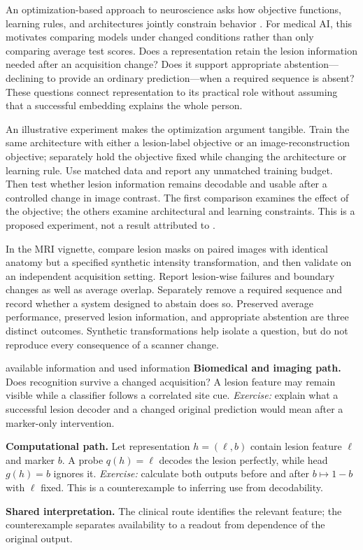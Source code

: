 \documentclass[11pt,a4paper]{article}
\begin{document}
An optimization-based approach to neuroscience asks how objective functions, learning rules, and architectures jointly constrain behavior \citep{richards2019}. For medical AI, this motivates comparing models under changed conditions rather than only comparing average test scores. Does a representation retain the lesion information needed after an acquisition change? Does it support appropriate abstention---declining to provide an ordinary prediction---when a required sequence is absent? These questions connect representation to its practical role without assuming that a successful embedding explains the whole person.

An illustrative experiment makes the optimization argument tangible. Train the same architecture with either a lesion-label objective or an image-reconstruction objective; separately hold the objective fixed while changing the architecture or learning rule. Use matched data and report any unmatched training budget. Then test whether lesion information remains decodable and usable after a controlled change in image contrast. The first comparison examines the effect of the objective; the others examine architectural and learning constraints. This is a proposed experiment, not a result attributed to \citet{richards2019}.

In the MRI vignette, compare lesion masks on paired images with identical anatomy but a specified synthetic intensity transformation, and then validate on an independent acquisition setting. Report lesion-wise failures and boundary changes as well as average overlap. Separately remove a required sequence and record whether a system designed to abstain does so. Preserved average performance, preserved lesion information, and appropriate abstention are three distinct outcomes. Synthetic transformations help isolate a question, but do not reproduce every consequence of a scanner change.

\begin{perspectives}{available information and used information}
\textbf{Biomedical and imaging path.} Does recognition survive a changed acquisition? A lesion feature may remain visible while a classifier follows a correlated site cue. \emph{Exercise:} explain what a successful lesion decoder and a changed original prediction would mean after a marker-only intervention.

\textbf{Computational path.} Let representation $h=(\ell,b)$ contain lesion feature $\ell$ and marker $b$. A probe $q(h)=\ell$ decodes the lesion perfectly, while head $g(h)=b$ ignores it. \emph{Exercise:} calculate both outputs before and after $b\mapsto1-b$ with $\ell$ fixed. This is a counterexample to inferring use from decodability.

\textbf{Shared interpretation.} The clinical route identifies the relevant feature; the counterexample separates availability to a readout from dependence of the original output.
\end{perspectives}
\end{document}

